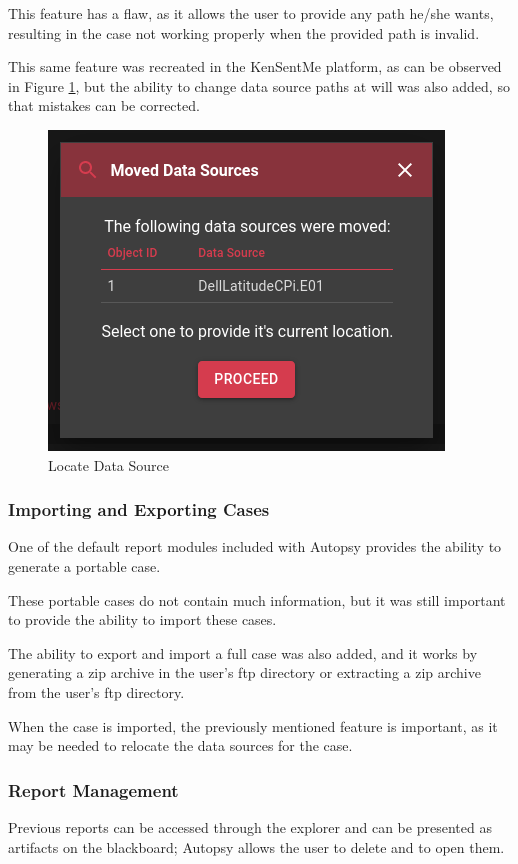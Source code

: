 This feature has a flaw, as it allows the user to provide any path he/she wants, resulting in the case not working properly when the provided path is invalid.

This same feature was recreated in the KenSentMe platform, as can be observed in Figure \ref{fig:locate}, but the ability to change data source paths at will was also added, so that mistakes can be corrected.

\begin{figure}[ht]
 \centering
 \includegraphics[width=0.6\linewidth]{imgs/locate.png}
 \caption{Locate Data Source}
 \label{fig:locate}
\end{figure}

\subsubsection*{Importing and Exporting Cases}

One of the default report modules included with Autopsy provides the ability to generate a portable case.

These portable cases do not contain much information, but it was still important to provide the ability to import these cases.

The ability to export and import a full case was also added, and it works by generating a zip archive in the user's \acrshort{ftp} directory or extracting a zip archive from the user's \acrshort{ftp} directory.

When the case is imported, the previously mentioned feature is important, as it may be needed to relocate the data sources for the case.

\subsubsection*{Report Management}

Previous reports can be accessed through the explorer and can be presented as artifacts on the blackboard; Autopsy allows the user to delete and to open them.


